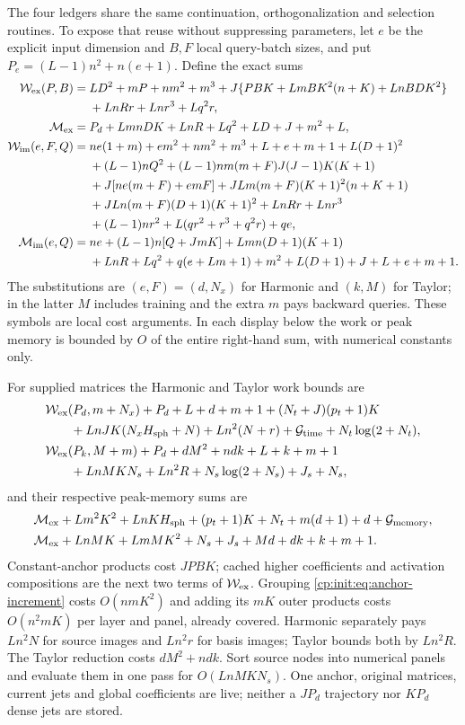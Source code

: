 The four ledgers share the same continuation, orthogonalization and
selection routines. To expose that reuse without suppressing parameters,
let $e$ be the explicit input dimension and $B,F$ local query-batch
sizes, and put $P_e=(L-1)n^2+n(e+1)$. Define the exact sums
\begin{align*}
\mathcal W_{\rm ex}(P,B)={}&LD^2+mP+nm^2+m^3
 +J\{PBK+LmBK^2(n+K)+LnBDK^2\}\\
 &+LnRr+Lnr^3+Lq^2r,\\
\mathcal M_{\rm ex}={}&P_d+LmnDK+LnR+Lq^2+LD+J+m^2+L,\\
\mathcal W_{\rm im}(e,F,Q)={}&ne(1+m)+em^2+nm^2+m^3+L+e+m+1+L(D+1)^2\\
 &+(L-1)nQ^2+(L-1)nm(m+F)J(J-1)K(K+1)\\
 &+J[ne(m+F)+emF]+JLm(m+F)(K+1)^2(n+K+1)\\
 &+JLn(m+F)(D+1)(K+1)^2+LnRr+Lnr^3\\
 &+(L-1)nr^2+L(qr^2+r^3+q^2r)+qe,\\
\mathcal M_{\rm im}(e,Q)={}&ne+(L-1)n[Q+JmK]+Lmn(D+1)(K+1)\\
 &+LnR+Lq^2+q(e+Lm+1)+m^2+L(D+1)+J+L+e+m+1.
\end{align*}
The substitutions are $(e,F)=(d,N_x)$ for Harmonic and $(k,M)$
for Taylor; in the latter $M$ includes training and the extra $m$
pays backward queries. These symbols are local cost arguments.
In each display below the work or peak memory is bounded by $O$ of the
entire right-hand sum, with numerical constants only.

For supplied matrices the Harmonic and Taylor work bounds are
\begin{align}
&\mathcal W_{\rm ex}(P_d,m+N_x)+P_d+L+d+m+1
 +(N_t+J)(p_t+1)K \nonumber\\
&\qquad+LnJK(N_xH_{\rm sph}+N)+Ln^2(N+r)
 +\mathcal G_{\rm time}+N_t\log(2+N_t),
\label{cp:init:eq:explicit-harmonic-work}\\
&\mathcal W_{\rm ex}(P_k,M+m)+P_d+dM^2+ndk+L+k+m+1 \nonumber\\
&\qquad+LnMKN_s+Ln^2R+N_s\log(2+N_s)+J_s+N_s,
\label{cp:init:eq:explicit-taylor-work}
\end{align}
and their respective peak-memory sums are
\begin{align}
&\mathcal M_{\rm ex}+Lm^2K^2+LnKH_{\rm sph}
 +(p_t+1)K+N_t+m(d+1)+d+\mathcal G_{\rm memory},
\label{cp:init:eq:explicit-harmonic-memory}\\
&\mathcal M_{\rm ex}+LnMK+LmMK^2+N_s+J_s+Md+dk+k+m+1.
\label{cp:init:eq:explicit-taylor-memory}
\end{align}
Constant-anchor products cost $JPBK$; cached higher coefficients and
activation compositions are the next two terms of $\mathcal W_{\rm ex}$.
Grouping \eqref{cp:init:eq:anchor-increment} costs $O(nmK^2)$ and
adding its $mK$ outer products costs $O(n^2mK)$ per layer and panel,
already covered. Harmonic separately pays $Ln^2N$ for source images
and $Ln^2r$ for basis images; Taylor bounds both by $Ln^2R$.
The Taylor reduction costs $dM^2+ndk$. Sort source nodes into numerical
panels and evaluate them in one pass for $O(LnMKN_s)$.
One anchor, original matrices, current jets and global coefficients are
live; neither a $JP_d$ trajectory nor $KP_d$ dense jets are stored.

